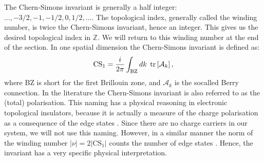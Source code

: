 The Chern-Simons invariant is generally a half integer: $\dots, -3/2, -1, -1/2, 0, 1/2, \dots$. The topological index, generally called the winding number, is twice the Chern-Simons invariant, hence an integer. This gives us the desired topological index in $\mathbb{Z}$. We will return to this winding number at the end of the section. In one spatial dimension the Chern-Simons invariant is defined as:
\begin{equation}
\text{CS}_1 = \frac{i}{2\pi}\int_{\text{BZ}}dk \; \operatorname{tr}\left[\mathcal{A}_k\right], \nonumber
\end{equation}
where BZ is short for the first Brillouin zone, and $\mathcal{A}_k$ is the socalled Berry connection. In the literature the Chern-Simons invariant is also referred to as the (total) polarisation. This naming has a physical reasoning in electronic topological insulators, because it is actually a measure of the charge polarisation as a consequence of the edge states \cite{FuKane2006}. Since there are no charge carriers in our system, we will not use this naming. However, in a similar manner the norm of the winding number $|\nu| = 2|\text{CS}_1|$ counts the number of edge states \cite{Chiu.Topology}. Hence, the invariant has a very specific physical interpretation. 

